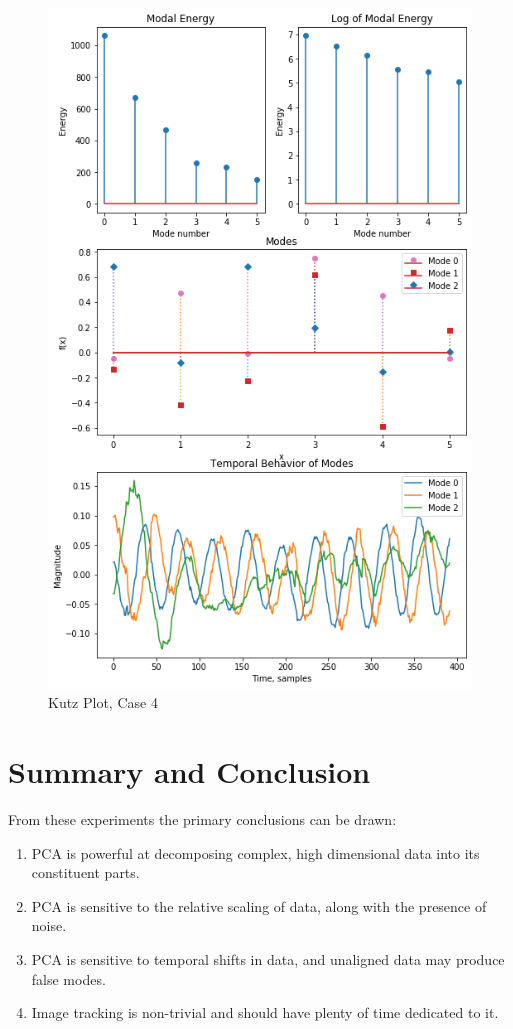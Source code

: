 \documentclass[journal]{IEEEtran}
\begin{document}
\begin{figure}
	\centerline{\includegraphics[width=\columnwidth]{kutz4.png}}
	\caption{Kutz Plot, Case 4}
	\label{kutz4}
\end{figure}


\section{Summary and Conclusion}
From these experiments the primary conclusions can be drawn:
\begin{enumerate}
    \item PCA is powerful at decomposing complex, high dimensional data into its constituent parts.
    \item PCA is sensitive to the relative scaling of data, along with the presence of noise.
    \item PCA is sensitive to temporal shifts in data, and unaligned data may produce false modes.
    \item Image tracking is non-trivial and should have plenty of time dedicated to it.
\end{enumerate}
\end{document}
